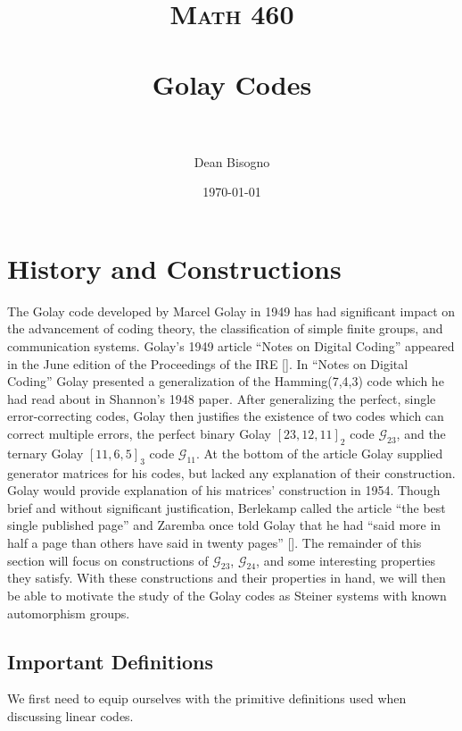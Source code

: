 \documentclass[paper=a4, fontsize=11pt]{scrartcl} %
\title{	
\normalfont \normalsize 
\textsc{Math 460} \\ [25pt] %
\horrule{0.5pt} \\[0.4cm] %
\huge Golay Codes\\ %
\horrule{2pt} \\[0.5cm] %
}
\author{Dean Bisogno} %
\date{\normalsize\today} %
\numberwithin{equation}{section} %
\numberwithin{figure}{section} %
\numberwithin{table}{section} %
\theoremstyle{break}
\begin{document}
\maketitle %

\section{History and Constructions}

The Golay code developed by Marcel Golay in 1949 has had significant impact on the advancement of coding theory, the classification of simple finite groups, and communication systems. Golay's 1949 article ``Notes on Digital Coding'' appeared in the June edition of the Proceedings of the IRE [\cite{golay}]. In ``Notes on Digital Coding'' Golay presented a generalization of the Hamming(7,4,3) code which he had read about in Shannon's 1948 paper. After generalizing the perfect, single error-correcting codes, Golay then justifies the existence of two codes which can correct multiple errors, the perfect binary Golay $[23,12,11]_2$ code $\mathcal{G}_{23}$, and the ternary Golay $[11,6,5]_3$ code $\mathcal{G}_{11}$. At the bottom of the article Golay supplied generator matrices for his codes, but lacked any explanation of their construction. Golay would provide explanation of his matrices' construction in 1954. Though brief and without significant justification, Berlekamp called the article ``the best single published page'' and Zaremba once told Golay that he had ``said more in half a page than others have said in twenty pages'' [\cite{thompson}]. The remainder of this section will focus on constructions of $\mathcal{G}_{23}$, $\mathcal{G}_{24}$, and some interesting properties they satisfy. With these constructions and their properties in hand, we will then be able to motivate the study of the Golay codes as Steiner systems with known automorphism groups.

\subsection{Important Definitions}
We first need to equip ourselves with the primitive definitions used when discussing linear codes.
\end{document}
